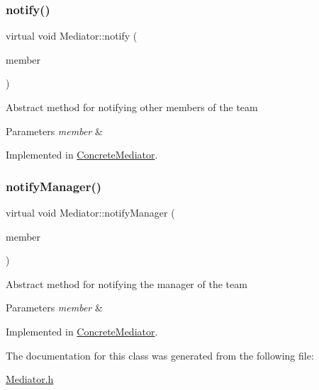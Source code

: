 \mbox{\label{class_mediator_acd0f8876148e8aef1f03a80072832bf8}} 
\subsubsection{\texorpdfstring{notify()}{notify()}}
{\footnotesize\ttfamily virtual void Mediator\+::notify (\begin{DoxyParamCaption}\item[{\mbox{\hyperlink{class_pit_crew}{Pit\+Crew}} $\ast$}]{member }\end{DoxyParamCaption})\hspace{0.3cm}{\ttfamily [pure virtual]}}

Abstract method for notifying other members of the team 
\begin{DoxyParams}{Parameters}
{\em member} & \\
\hline
\end{DoxyParams}


Implemented in \mbox{\hyperlink{class_concrete_mediator_aea62657783ed54f1152fe129e4adc8d3}{Concrete\+Mediator}}.

\mbox{\label{class_mediator_a044f7032c52ca2359f98b798ccd555d3}} 
\subsubsection{\texorpdfstring{notify\+Manager()}{notifyManager()}}
{\footnotesize\ttfamily virtual void Mediator\+::notify\+Manager (\begin{DoxyParamCaption}\item[{\mbox{\hyperlink{class_pit_crew}{Pit\+Crew}} $\ast$}]{member }\end{DoxyParamCaption})\hspace{0.3cm}{\ttfamily [pure virtual]}}

Abstract method for notifying the manager of the team 
\begin{DoxyParams}{Parameters}
{\em member} & \\
\hline
\end{DoxyParams}


Implemented in \mbox{\hyperlink{class_concrete_mediator_ac4a804e3f7f6a74240ae249cf1f315ec}{Concrete\+Mediator}}.



The documentation for this class was generated from the following file\+:\begin{DoxyCompactItemize}
\item 
\mbox{\hyperlink{_mediator_8h}{Mediator.\+h}}\end{DoxyCompactItemize}
